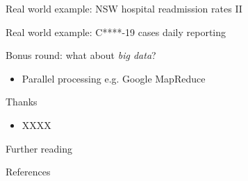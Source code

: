 \documentclass[aspectratio=169,12pt,usepdftitle=false]{beamer} %
\begin{document}
\begin{frame}{Real world example: NSW hospital readmission rates II}
\end{frame}

\begin{frame}{Real world example: C****-19 cases daily reporting}
\end{frame}

\begin{frame}{Bonus round: what about \emph{big data}?}
    \begin{itemize}
	\item Parallel processing e.g. Google MapReduce
    \end{itemize}
\end{frame}

%
%
%
%
%










\begin{frame}{Thanks}
    \begin{itemize}
        \item XXXX
    \end{itemize}
\end{frame}

\begin{frame}{Further reading}
\end{frame}

\begin{frame}{References}
        \tiny
        
\end{frame}
\end{document}

